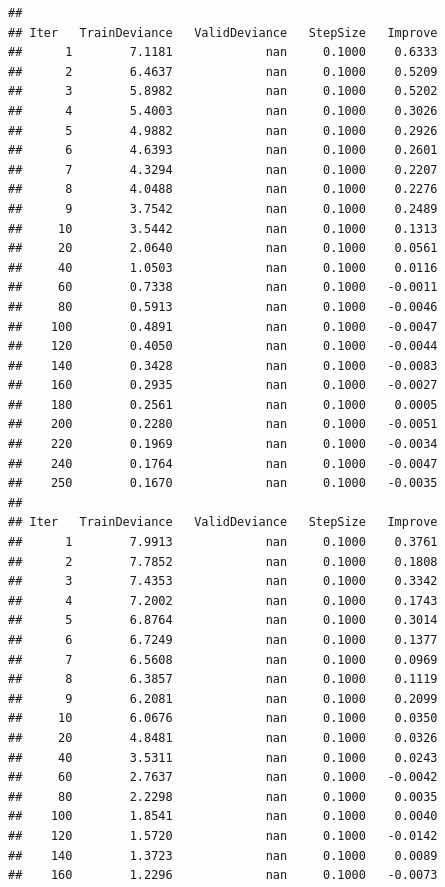 \documentclass[]{book}
\begin{document}
\begin{verbatim}
## 
## Iter   TrainDeviance   ValidDeviance   StepSize   Improve
##      1        7.1181             nan     0.1000    0.6333
##      2        6.4637             nan     0.1000    0.5209
##      3        5.8982             nan     0.1000    0.5202
##      4        5.4003             nan     0.1000    0.3026
##      5        4.9882             nan     0.1000    0.2926
##      6        4.6393             nan     0.1000    0.2601
##      7        4.3294             nan     0.1000    0.2207
##      8        4.0488             nan     0.1000    0.2276
##      9        3.7542             nan     0.1000    0.2489
##     10        3.5442             nan     0.1000    0.1313
##     20        2.0640             nan     0.1000    0.0561
##     40        1.0503             nan     0.1000    0.0116
##     60        0.7338             nan     0.1000   -0.0011
##     80        0.5913             nan     0.1000   -0.0046
##    100        0.4891             nan     0.1000   -0.0047
##    120        0.4050             nan     0.1000   -0.0044
##    140        0.3428             nan     0.1000   -0.0083
##    160        0.2935             nan     0.1000   -0.0027
##    180        0.2561             nan     0.1000    0.0005
##    200        0.2280             nan     0.1000   -0.0051
##    220        0.1969             nan     0.1000   -0.0034
##    240        0.1764             nan     0.1000   -0.0047
##    250        0.1670             nan     0.1000   -0.0035
## 
## Iter   TrainDeviance   ValidDeviance   StepSize   Improve
##      1        7.9913             nan     0.1000    0.3761
##      2        7.7852             nan     0.1000    0.1808
##      3        7.4353             nan     0.1000    0.3342
##      4        7.2002             nan     0.1000    0.1743
##      5        6.8764             nan     0.1000    0.3014
##      6        6.7249             nan     0.1000    0.1377
##      7        6.5608             nan     0.1000    0.0969
##      8        6.3857             nan     0.1000    0.1119
##      9        6.2081             nan     0.1000    0.2099
##     10        6.0676             nan     0.1000    0.0350
##     20        4.8481             nan     0.1000    0.0326
##     40        3.5311             nan     0.1000    0.0243
##     60        2.7637             nan     0.1000   -0.0042
##     80        2.2298             nan     0.1000    0.0035
##    100        1.8541             nan     0.1000    0.0040
##    120        1.5720             nan     0.1000   -0.0142
##    140        1.3723             nan     0.1000    0.0089
##    160        1.2296             nan     0.1000   -0.0073

\end{verbatim}
\end{document}
